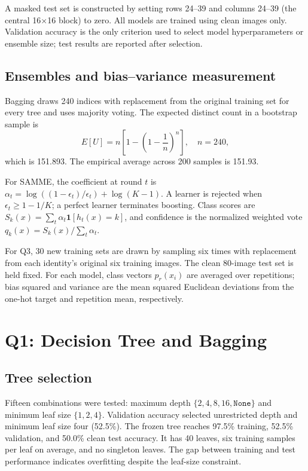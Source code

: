 \documentclass[10pt,twocolumn,letterpaper]{article}
\newcommand{\samme}{\textsc{SAMME}}
\begin{document}
A masked test set is constructed by setting rows 24--39 and columns 24--39 (the central 16$\times$16 block) to zero. All models are trained using clean images only. Validation accuracy is the only criterion used to select model hyperparameters or ensemble size; test results are reported after selection.

\subsection{Ensembles and bias--variance measurement}
Bagging draws 240 indices with replacement from the original training set for every tree and uses majority voting. The expected distinct count in a bootstrap sample is
\begin{equation}
E[U]=n\left[1-\left(1-\frac{1}{n}\right)^n\right],\quad n=240,
\end{equation}
which is 151.893. The empirical average across 200 samples is 151.93.

For \samme{}, the coefficient at round $t$ is $\alpha_t=\log((1-\epsilon_t)/\epsilon_t)+\log(K-1)$. A learner is rejected when $\epsilon_t\geq1-1/K$; a perfect learner terminates boosting. Class scores are $S_k(x)=\sum_t\alpha_t\mathbf{1}[h_t(x)=k]$, and confidence is the normalized weighted vote $q_k(x)=S_k(x)/\sum_t\alpha_t$.

For Q3, 30 new training sets are drawn by sampling six times with replacement from each identity's original six training images. The clean 80-image test set is held fixed. For each model, class vectors $p_r(x_i)$ are averaged over repetitions; bias squared and variance are the mean squared Euclidean deviations from the one-hot target and repetition mean, respectively.

\section{Q1: Decision Tree and Bagging}
\subsection{Tree selection}
Fifteen combinations were tested: maximum depth $\{2,4,8,16,\texttt{None}\}$ and minimum leaf size $\{1,2,4\}$. Validation accuracy selected unrestricted depth and minimum leaf size four (52.5\%). The frozen tree reaches 97.5\% training, 52.5\% validation, and 50.0\% clean test accuracy. It has 40 leaves, six training samples per leaf on average, and no singleton leaves. The gap between training and test performance indicates overfitting despite the leaf-size constraint.
\end{document}
